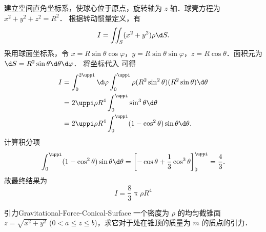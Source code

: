 \begin{solution}
    建立空间直角坐标系，使球心位于原点，旋转轴为 $z$ 轴．球壳方程为 $x^2 + y^2 + z^2 = R^2$．
    根据转动惯量定义，有
    \begin{equation}
        \label{eq:Inertia-Def-1}
        I = \iint_{S} (x^2 + y^2) \rho \d S.
    \end{equation}
    采用球面坐标系，令 $x = R \sin \theta \cos \varphi$，$y = R \sin \theta \sin \varphi$，$z = R \cos \theta$．面积元为 $\d S = R^2 \sin \theta \d \theta \d \varphi$．
    将坐标代入  可得
    \begin{equation}
        \begin{aligned}
            I & = \int_{0}^{2\uppi} \d \varphi \int_{0}^{\uppi} \rho (R^2 \sin^2 \theta) (R^2 \sin \theta) \d \theta \\
              & = 2\uppi \rho R^4 \int_{0}^{\uppi} \sin^3 \theta \d \theta                                           \\
              & = 2\uppi \rho R^4 \int_{0}^{\uppi} (1 - \cos^2 \theta) \sin \theta \d \theta.
        \end{aligned}
    \end{equation}
    计算积分项
    \begin{equation}
        \int_{0}^{\uppi} (1 - \cos^2 \theta) \sin \theta \d \theta = \left[ -\cos \theta + \frac{1}{3} \cos^3 \theta \right]_{0}^{\uppi} = \frac{4}{3}.
    \end{equation}
    故最终结果为
    \begin{equation}
        I = \boxed{\frac{8}{3} \uppi \rho R^4}
    \end{equation}
\end{solution}

\begin{problem}{引力}{Gravitational-Force-Conical-Surface}
    一个密度为 $\rho$ 的均匀截锥面 $z = \sqrt{x^2 + y^2}$ ($0 < a \le z \le b$)，求它对于处在锥顶的质量为 $m$ 的质点的引力．
\end{problem}

